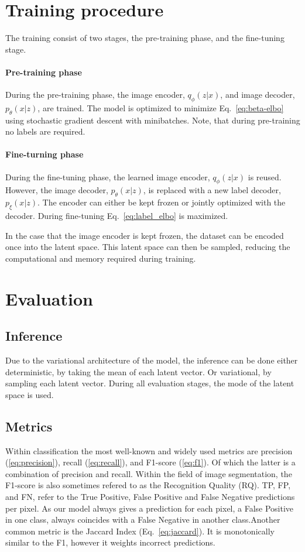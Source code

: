 \section{Training procedure}
The training consist of two stages, the pre-training phase, and the fine-tuning stage. 
\paragraph*{Pre-training phase} During the pre-training phase, the image encoder, $q_\phi(z|x)$, and image decoder, $p_\theta(x|z)$, are trained. The model is optimized to minimize Eq.~\ref{eq:beta-elbo} using stochastic gradient descent with minibatches. Note, that during pre-training no labels are required.

\paragraph*{Fine-turning phase} During the fine-tuning phase, the learned image encoder, $q_\phi(z|x)$ is reused. However, the image decoder, $p_\theta(x|z)$, is replaced with a new label decoder, $p_\xi(x|z)$. The encoder can either be kept frozen or jointly optimized with the decoder. During fine-tuning Eq.~\ref{eq:label_elbo} is maximized.

In the case that the image encoder is kept frozen, the dataset can be encoded once into the latent space. This latent space can then be sampled, reducing the computational and memory required during training.

\section{Evaluation}
\subsection{Inference}
Due to the variational architecture of the model, the inference can be done either deterministic, by taking the mean of each latent vector. Or variational, by sampling each latent vector. During all evaluation stages, the mode of the latent space is used.

\subsection{Metrics}
Within classification the most well-known and widely used metrics are precision (\ref{eq:precision}), recall (\ref{eq:recall}), and F1-score (\ref{eq:f1})\cite{rijsbergen1979information}. Of which the latter is a combination of precision and recall. Within the field of image segmentation, the F1-score is also sometimes refered to as the Recognition Quality (RQ). TP, FP, and FN, refer to the True Positive, False Positive and False Negative predictions per pixel. As our model always gives a prediction for each pixel, a False Positive in one class, always coincides with a False Negative in another class.Another common metric is the Jaccard Index (Eq.~\ref{eq:jaccard}). It is monotonically similar to the F1, however it weights incorrect predictions.

